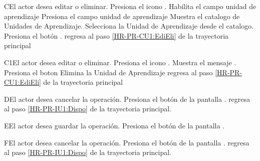 \begin{UCtrayectoriaA}{C}{El actor desea editar o eliminar.}
	\UCpaso [\UCactor] Presiona el icono . 
	\UCpaso [\UCsist] Habilita el campo unidad de aprendizaje
	\UCpaso [\UCactor] Presiona el campo unidad de aprendizaje 
	\UCpaso [\UCsist] Muestra el catalogo de Unidades de Aprendizaje. 
	\UCpaso [\UCactor] Selecciona la Unidad de Aprendizaje desde el catalogo.
	\UCpaso [\UCactor] Presiona el botón . 
	\UCpaso [\UCsist] regresa al paso \ref{HR-PR-CU1:EdiEli} de la trayectoria principal
\end{UCtrayectoriaA} 

\begin{UCtrayectoriaA}{C1}{El actor desea editar o eliminar.}
	\UCpaso [\UCactor] Presiona el icono .
	\UCpaso [\UCsist] Muestra el mensaje .
	\UCpaso [\UCactor] Presiona el boton 
	\UCpaso [\UCsist] Elimina la Unidad de Aprendizaje
	\UCpaso [\UCsist] regresa al paso \ref{HR-PR-CU1:EdiEli} de la trayectoria principal
\end{UCtrayectoriaA} 


\begin{UCtrayectoriaA}{D}{El actor desea cancelar la operación.}
	\UCpaso [\UCactor] Presiona el botón  de la pantalla .
	\UCpaso regresa al paso \ref{HR-PR-IU1:Dispo} de la trayectoria principal.
\end{UCtrayectoriaA}

\begin{UCtrayectoriaA}{E}{El actor desea guardar la operación.}
	\UCpaso [\UCactor] Presiona el botón  de la pantalla .
\end{UCtrayectoriaA} 

\begin{UCtrayectoriaA}{F}{El actor desea cancelar la operación.}
	\UCpaso [\UCactor] Presiona el botón  de la pantalla .
	\UCpaso regresa al paso \ref{HR-PR-IU1:Dispo} de la trayectoria principal.
\end{UCtrayectoriaA}




